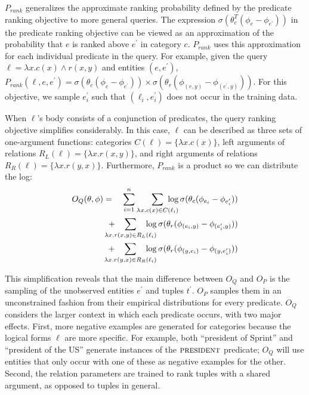 \documentclass[11pt]{article}
\newcommand{\pred}[1]{\textsc{#1}}
\begin{document}
$P_{rank}$ generalizes the approximate ranking probability defined by
the predicate ranking objective to more general queries. The
expression $\sigma (\theta_{c}^T (\phi_{e} - \phi_{e^\prime}))$ in the
predicate ranking objective can be viewed as an approximation of the
probability that $e$ is ranked above $e^\prime$ in category
$c$. $P_{rank}$ uses this approximation for each individual predicate
in the query. For example, given the query $\ell = \lambda x.c(x)
\wedge r(x, y)$ and entities $(e, e^\prime)$, $P_{rank}(\ell, e,
e^\prime) = \sigma( \theta_c (\phi_e - \phi_{e^\prime})) \times
\sigma( \theta_r (\phi_{(e,y)} - \phi_{(e^\prime, y)}))$. For this
objective, we sample $e^\prime_i$ such that $(\ell_i, e^\prime_i)$
does not occur in the training data.

When $\ell$'s body consists of a conjunction of predicates, the query
ranking objective simplifies considerably. In this case, $\ell$ can be
described as three sets of one-argument functions: categories
$C(\ell)= \{\lambda x.c(x)\}$, left arguments of relations $R_L(\ell)
= \{\lambda x.r(x, y)\}$, and right arguments of relations $R_R(\ell)
= \{\lambda x.r(y, x)\}$. Furthermore, $P_{rank}$ is a product so we
can distribute the log:
\begin{eqnarray*}
O_{Q}(\theta, \phi) & = & \sum_{i=1}^n \sum_{\lambda x.c(x) \in C(\ell_i)} \hspace{-.2in} \log
\sigma (\theta_{c} (\phi_{e_i} - \phi_{e^\prime_i})) \\
& & \hspace{-.2in} + \hspace{-.2in} \sum_{\lambda x.r(x, y) \in R_L(\ell_i)} \hspace{-.2in} \log \sigma (\theta_{r} ( \phi_{(e_i,y)} - \phi_{(e^\prime_i, y)} )) \\
& & \hspace{-.2in} + \hspace{-.2in} \sum_{\lambda x.r(y, x) \in R_R(\ell_i)} \hspace{-.2in} \log \sigma (\theta_{r} ( \phi_{(y, e_i)} - \phi_{(y, e^\prime_i)} )) 
\end{eqnarray*}

This simplification reveals that the main difference between $O_{Q}$
and $O_{P}$ is the sampling of the unobserved entities $e^\prime$ and
tuples $t^\prime$. $O_{P}$ samples them in an unconstrained fashion
from their empirical distributions for every predicate. $O_{Q}$
considers the larger context in which each predicate occurs, with two
major effects. First, more negative examples are generated for
categories because the logical forms $\ell$ are more specific. For
example, both ``president of Sprint'' and ``president of the US''
generate instances of the $\pred{president}$ predicate; $O_Q$ will use
entities that only occur with one of these as negative examples for
the other. Second, the relation parameters are trained to rank tuples
with a shared argument, as opposed to tuples in general.
\end{document}
